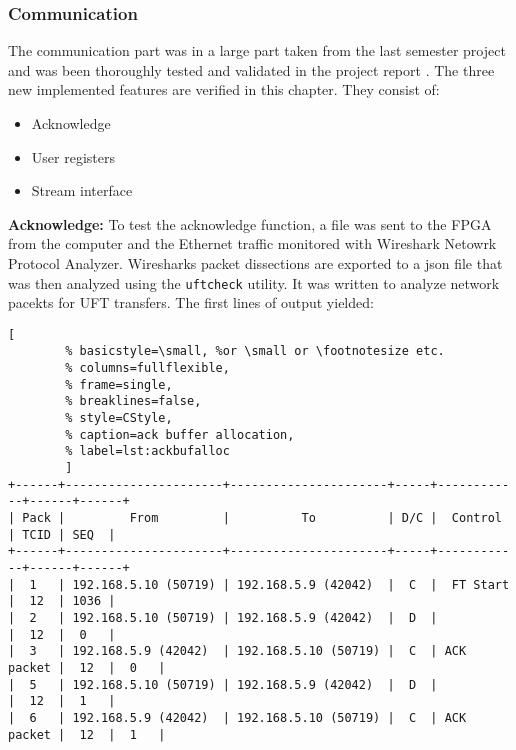 \subsubsection*{Communication}
The communication part was in a large part taken from the last semester project
and was been thoroughly tested and validated in the project report 
\cite{p5report}. The three new implemented features are verified in this
chapter. They consist of:
\begin{itemize}
    \item Acknowledge
    \item User registers
    \item Stream interface
\end{itemize}

\vspace{1ex}
\textbf{Acknowledge:} To test the acknowledge function, a file was sent to the
FPGA from the computer
and the Ethernet traffic monitored with Wireshark Netowrk Protocol Analyzer.
Wiresharks packet dissections are exported to a json file that was then analyzed
using the \texttt{uftcheck} utility. It was written to analyze network pacekts
for UFT transfers. The first lines of output yielded:

    \begin{adjustbox}{max width=1.7\textwidth}
\begin{minipage}{2\linewidth}
    \begin{lstlisting}[
        % basicstyle=\small, %or \small or \footnotesize etc.
        % columns=fullflexible,
        % frame=single,
        % breaklines=false,
        % style=CStyle, 
        % caption=ack buffer allocation, 
        % label=lst:ackbufalloc
        ]
+------+----------------------+----------------------+-----+------------+------+------+
| Pack |         From         |          To          | D/C |  Control   | TCID | SEQ  | 
+------+----------------------+----------------------+-----+------------+------+------+
|  1   | 192.168.5.10 (50719) | 192.168.5.9 (42042)  |  C  |  FT Start  |  12  | 1036 |
|  2   | 192.168.5.10 (50719) | 192.168.5.9 (42042)  |  D  |            |  12  |  0   |
|  3   | 192.168.5.9 (42042)  | 192.168.5.10 (50719) |  C  | ACK packet |  12  |  0   |
|  5   | 192.168.5.10 (50719) | 192.168.5.9 (42042)  |  D  |            |  12  |  1   |
|  6   | 192.168.5.9 (42042)  | 192.168.5.10 (50719) |  C  | ACK packet |  12  |  1   |\end{lstlisting}
\end{minipage}
\end{adjustbox}

